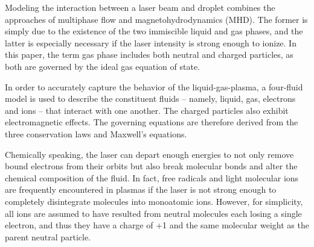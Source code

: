 
Modeling the interaction between a laser beam and droplet combines the approaches of multiphase flow and magnetohydrodynamics (MHD). The former is simply due to the existence of the two immiscible liquid and gas phases,
and the latter is especially necessary if the laser intensity is strong enough to ionize. In this paper, the term gas phase includes both neutral and charged particles, as both are governed by the ideal gas equation of
state.

In order to accurately capture the behavior of the liquid-gas-plasma, a four-fluid model is used to describe the constituent fluids -- namely, liquid, gas, electrons and ions -- that interact with one another. The charged
particles also exhibit electromagnetic effects. The governing equations are therefore derived from the three conservation laws and Maxwell's equations.

Chemically speaking, the laser can depart enough energies to not only remove bound electrons from their orbits but also break molecular bonds and alter the chemical composition of the fluid. In fact, free radicals and
light molecular ions are frequently encountered in plasmas if the laser is not strong enough to completely disintegrate molecules into monoatomic ions. However, for simplicity, all ions are assumed to have resulted
from neutral molecules each losing a single electron, and thus they have a charge of +1 and the same molecular weight as the parent neutral particle.